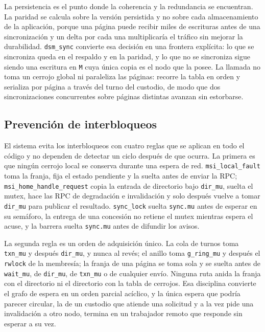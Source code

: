 La persistencia es el punto donde la coherencia y la redundancia se encuentran. La paridad se calcula sobre la versión persistida y no sobre cada almacenamiento de la aplicación, porque una página puede recibir miles de escrituras antes de una sincronización y un delta por cada una multiplicaría el tráfico sin mejorar la durabilidad. \texttt{dsm\_sync} convierte esa decisión en una frontera explícita: lo que se sincroniza queda en el respaldo y en la paridad, y lo que no se sincroniza sigue siendo una escritura en \texttt{M} cuya única copia es el nodo que la posee. La llamada no toma un cerrojo global ni paraleliza las páginas: recorre la tabla en orden y serializa por página a través del turno del custodio, de modo que dos sincronizaciones concurrentes sobre páginas distintas avanzan sin estorbarse.

\subsection{Prevención de interbloqueos}

El sistema evita los interbloqueos con cuatro reglas que se aplican en todo el código y no dependen de detectar un ciclo después de que ocurra. La primera es que ningún cerrojo local se conserva durante una espera de red. \texttt{msi\_local\_fault} toma la franja, fija el estado pendiente y la suelta antes de enviar la RPC; \texttt{msi\_home\_handle\_request} copia la entrada de directorio bajo \texttt{dir\_mu}, suelta el mutex, hace las RPC de degradación e invalidación y solo después vuelve a tomar \texttt{dir\_mu} para publicar el resultado. \texttt{sync\_lock} suelta \texttt{sync.mu} antes de esperar en su semáforo, la entrega de una concesión no retiene el mutex mientras espera el acuse, y la barrera suelta \texttt{sync.mu} antes de difundir los avisos.

La segunda regla es un orden de adquisición único. La cola de turnos toma \texttt{txn\_mu} y después \texttt{dir\_mu}, y nunca al revés; el anillo toma \texttt{g\_ring\_mu} y después el \texttt{rwlock} de la membresía; la franja de una página se toma sola y se suelta antes de \texttt{wait\_mu}, de \texttt{dir\_mu}, de \texttt{txn\_mu} o de cualquier envío. Ninguna ruta anida la franja con el directorio ni el directorio con la tabla de cerrojos. Esa disciplina convierte el grafo de espera en un orden parcial acíclico, y la única espera que podría parecer circular, la de un custodio que atiende una solicitud y a la vez pide una invalidación a otro nodo, termina en un trabajador remoto que responde sin esperar a su vez.

